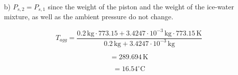 b) \( P_{s,2} = P_{s,1} \) since the weight of the piston and the weight of the ice-water mixture, as well as the ambient pressure do not change.

\[
T_{agg} = \frac{0.2 \, \text{kg} \cdot 773.15 + 3.4247 \cdot 10^{-3} \, \text{kg} \cdot 773.15 \, \text{K}}{0.2 \, \text{kg} + 3.4247 \cdot 10^{-3} \, \text{kg}}
\]

\[
= 289.694 \, \text{K}
\]

\[
= 16.54^\circ \text{C}
\]